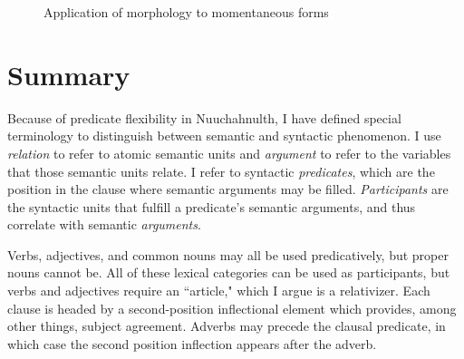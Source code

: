 \begin{figure}[H]
\begin{center}
\caption{Application of morphology to momentaneous forms}
\label{figure:momentaneousapplication}
\end{center}
\end{figure}

\section{Summary} \label{ch:clause:summary}

Because of predicate flexibility in Nuuchahnulth, I have defined special terminology to distinguish between semantic and syntactic phenomenon. I use \textit{relation} to refer to atomic semantic units and \textit{argument} to refer to the variables that those semantic units relate. I refer to syntactic \textit{predicates}, which are the position in the clause where semantic arguments may be filled. \textit{Participants} are the syntactic units that fulfill a predicate's semantic arguments, and thus correlate with semantic \textit{arguments}.

Verbs, adjectives, and common nouns may all be used predicatively, but proper nouns cannot be. All of these lexical categories can be used as participants, but verbs and adjectives require an ``article," which I argue is a relativizer. Each clause is headed by a second-position inflectional element which provides, among other things, subject agreement. Adverbs may precede the clausal predicate, in which case the second position inflection appears after the adverb.

